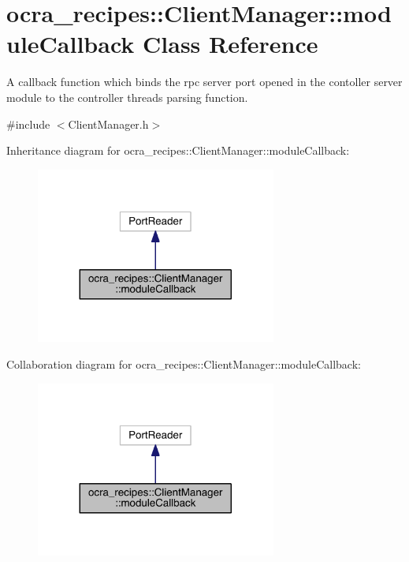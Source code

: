 \hypertarget{classocra__recipes_1_1ClientManager_1_1moduleCallback}{}\section{ocra\+\_\+recipes\+:\+:Client\+Manager\+:\+:module\+Callback Class Reference}
\label{classocra__recipes_1_1ClientManager_1_1moduleCallback}


A callback function which binds the rpc server port opened in the contoller server module to the controller thread\textquotesingle{}s parsing function.  




{\ttfamily \#include $<$Client\+Manager.\+h$>$}



Inheritance diagram for ocra\+\_\+recipes\+:\+:Client\+Manager\+:\+:module\+Callback\+:\nopagebreak
\begin{figure}[H]
\begin{center}
\leavevmode
\includegraphics[width=224pt]{dd/d37/classocra__recipes_1_1ClientManager_1_1moduleCallback__inherit__graph}
\end{center}
\end{figure}


Collaboration diagram for ocra\+\_\+recipes\+:\+:Client\+Manager\+:\+:module\+Callback\+:\nopagebreak
\begin{figure}[H]
\begin{center}
\leavevmode
\includegraphics[width=224pt]{dd/d3d/classocra__recipes_1_1ClientManager_1_1moduleCallback__coll__graph}
\end{center}
\end{figure}
